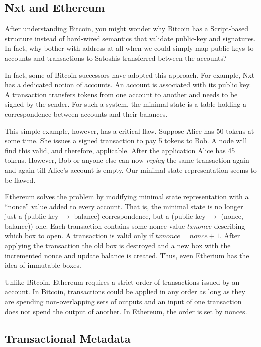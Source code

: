 \documentclass[]{report}   %
\begin{document}
\subsection{Nxt and Ethereum}	

After understanding Bitcoin, you might wonder why Bitcoin has a Script-based structure instead of hard-wired semantics that validate public-key and signatures. In fact, why bother with address at all when we could simply map public keys to accounts and transactions to Satoshis transferred between the accounts?

In fact, some of Bitcoin successors have adopted this approach. For example, Nxt has a dedicated notion of accounts. An account is associated with its public key. A transaction transfers tokens from one account to another and needs to be signed by the sender. For such a system, the minimal state is a table holding a correspondence between accounts and their balances.

This simple example, however, has a critical flaw. Suppose Alice has 50 tokens at some time. She issues a signed transaction to pay 5 tokens to Bob. A node will find this valid, and therefore, applicable. After the application Alice has 45 tokens. However, Bob or anyone else can now {\em replay} the same transaction again and again till Alice's account is empty. Our minimal state representation seems to be flawed.

Ethereum solves the problem by modifying minimal state representation with a ``nonce'' value added to every account. That is, the minimal state is no longer just a (public key $\rightarrow$ balance) correspondence, but a (public key $\rightarrow$ (nonce, balance)) one. Each transaction contains some nonce value \(txnonce\) describing which box to open. A transaction is valid only if \(txnonce = nonce + 1\). After applying the transaction the old box is destroyed and a new box with the incremented nonce and update balance is created. Thus, even Etherium has the idea of immutable boxes.

Unlike Bitcoin, Ethereum requires a strict order of transactions issued by an account. In Bitcoin, transactions could be applied in any order as long as they are spending non-overlapping sets of outputs and an input of one transaction does not spend the output of another. In Ethereum, the order is set by nonces. 



\subsection{Transactional Metadata}
\end{document}
